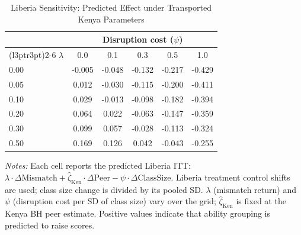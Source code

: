 \begin{table}[H]
\centering
\caption{Liberia Sensitivity: Predicted Effect under Transported Kenya Parameters}
\label{tab:lib_sensitivity}
\begin{threeparttable}
\begin{tabular}[t]{l*{5}{c}}
\toprule
 & \multicolumn{5}{c}{Disruption cost ($\psi$)} \\
\cmidrule(l{3pt}r{3pt}){2-6}
$\lambda$ & 0.0 & 0.1 & 0.3 & 0.5 & 1.0 \\
\midrule
0.00 &  -0.005 &  -0.048 &  -0.132 &  -0.217 &  -0.429 \\
0.05 &   0.012 &  -0.030 &  -0.115 &  -0.200 &  -0.411 \\
0.10 &   0.029 &  -0.013 &  -0.098 &  -0.182 &  -0.394 \\
0.20 &   0.064 &   0.022 &  -0.063 &  -0.147 &  -0.359 \\
0.30 &   0.099 &   0.057 &  -0.028 &  -0.113 &  -0.324 \\
0.50 &   0.169 &   0.126 &   0.042 &  -0.043 &  -0.255 \\
\bottomrule
\end{tabular}
\begin{tablenotes}
\footnotesize
\item \textit{Notes:} Each cell reports the predicted Liberia ITT: $\lambda \cdot \Delta\text{Mismatch} + \hat{\zeta}_{\text{Ken}} \cdot \Delta\text{Peer} - \psi \cdot \Delta\text{ClassSize}$. Liberia treatment control shifts are used; class size change is divided by its pooled SD. $\lambda$ (mismatch return) and $\psi$ (disruption cost per SD of class size) vary over the grid; $\hat{\zeta}_{\text{Ken}}$ is fixed at the Kenya BH peer estimate. Positive values indicate that ability grouping is predicted to raise scores.
\end{tablenotes}
\end{threeparttable}
\end{table}
